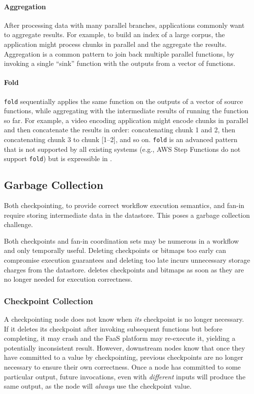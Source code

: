 \paragraph{Aggregation}
After processing data with many parallel branches, applications commonly want to
aggregate results. For example, to build an index of a large corpus, the
application might process chunks in parallel and the aggregate the results.
Aggregation is a common pattern to join back multiple parallel functions, by
invoking a single ``sink'' function with the outputs from a vector of functions.

\paragraph{Fold}
\texttt{fold} sequentially applies the same function on the outputs of a vector
of source functions, while aggregating with the intermediate results of running
the function so far. For example, a video encoding application might encode
chunks in parallel and then concatenate the results in order: concatenating
chunk 1 and 2, then concatenating chunk 3 to chunk [1--2], and so on.
\texttt{fold} is an advanced pattern that is not supported by all existing
systems (e.g., AWS Step Functions do not support \texttt{fold}) but is
expressible in \name{}.


\subsection{Garbage Collection}\label{sec:design:garbage}

Both checkpointing, to provide correct workflow execution semantics, and fan-in
require storing intermediate data in the datastore. This poses a garbage
collection challenge.

Both checkpoints and fan-in coordination sets may be numerous in a workflow and only
temporally useful. Deleting checkpoints or bitmaps too early can compromise
execution guarantees and deleting too late incurs unnecessary storage charges
from the datastore. \name{} deletes checkpoints and bitmaps as soon as they are
no longer needed for execution correctness.

\subsubsection{Checkpoint Collection}

A checkpointing node does not know when \emph{its} checkpoint is no longer
necessary.  If it deletes its checkpoint after invoking subsequent functions but
before completing, it may crash and the FaaS platform may re-execute it,
yielding a potentially inconsistent result. However, downstream nodes know that
once they have committed to a value by checkpointing, previous checkpoints are
no longer necessary to ensure their own correctness. Once a node has committed
to some particular output, future invocations, even with \emph{different} inputs
will produce the same output, as the node will \emph{always} use the checkpoint
value.

